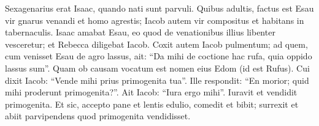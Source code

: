 \begin{biblechapter}
\verse Sexagenarius erat Isaac, quando nati sunt parvuli. 
\verse Quibus adultis, factus est Esau vir gnarus venandi et homo agrestis; Iacob autem vir compositus et habitans in tabernaculis. 
\verse Isaac amabat Esau, eo quod de venationibus illius libenter vesceretur; et Rebecca diligebat Iacob.  
\verse Coxit autem Iacob pulmentum; ad quem, cum venisset Esau de agro lassus,  
\verse ait: “Da mihi de coctione hac rufa, quia oppido lassus sum”. Quam ob causam vocatum est nomen eius Edom (id est Rufus). 
\verse Cui dixit Iacob: “Vende mihi prius primogenita tua”. 
\verse Ille respondit: “En morior; quid mihi proderunt primogenita?”. 
\verse Ait Iacob: “Iura ergo mihi”. Iuravit et vendidit primogenita. 
\verse Et sic, accepto pane et lentis edulio, comedit et bibit; surrexit et abiit parvipendens quod primogenita vendidisset. 
\end{biblechapter}

